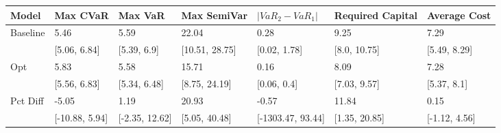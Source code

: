 \begin{tabular}{lllllll}
\toprule
   Model &       Max CVaR &        Max VaR &    Max SemiVar & $|VaR_2 - VaR_1|$ & Required Capital &  Average Cost \\
\midrule
Baseline &           5.46 &           5.59 &          22.04 &              0.28 &             9.25 &          7.29 \\
         &   [5.06, 6.84] &    [5.39, 6.9] & [10.51, 28.75] &      [0.02, 1.78] &     [8.0, 10.75] &  [5.49, 8.29] \\
     Opt &           5.83 &           5.58 &          15.71 &              0.16 &             8.09 &          7.28 \\
         &   [5.56, 6.83] &   [5.34, 6.48] &  [8.75, 24.19] &       [0.06, 0.4] &     [7.03, 9.57] &   [5.37, 8.1] \\
Pct Diff &          -5.05 &           1.19 &          20.93 &             -0.57 &            11.84 &          0.15 \\
         & [-10.88, 5.94] & [-2.35, 12.62] &  [5.05, 40.48] & [-1303.47, 93.44] &    [1.35, 20.85] & [-1.12, 4.56] \\
\bottomrule
\end{tabular}
